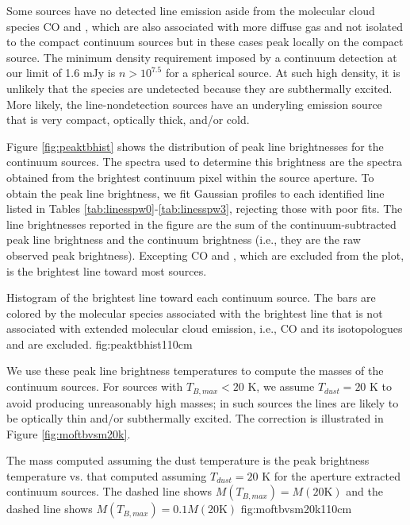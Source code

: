 \documentclass{aa}
\begin{document}
Some sources have no detected line emission aside from the molecular cloud
species CO and \formaldehyde, which are also associated with more diffuse gas
and not isolated to the compact continuum sources but in these cases peak
locally on the compact source.  The minimum density requirement imposed by a
continuum detection at our limit of 1.6 mJy is $n>10^{7.5}$ \percc for a
spherical source.  At such high density, it is unlikely that the species are
undetected because they are subthermally excited.  More likely, the
line-nondetection sources have an underyling emission source that is very
compact, optically thick, and/or cold.

Figure \ref{fig:peaktbhist} shows the distribution of peak line brightnesses
for the continuum sources.  The spectra used to determine this brightness are
the spectra obtained from the brightest continuum pixel within the source
aperture.  To obtain the peak line brightness, we fit Gaussian profiles to each
identified line listed in Tables \ref{tab:linesspw0}-\ref{tab:linesspw3},
rejecting those with poor fits.  The line brightnesses reported in the figure
are the sum of the continuum-subtracted peak line brightness and the continuum
brightness (i.e., they are the raw observed peak brightness).  Excepting CO and
\formaldehyde, which are excluded from the plot, \methanol is the brightest
line toward most sources. 

{Histogram of the brightest line toward each continuum source.
The bars are colored by the molecular species associated with the brightest
line that is not associated with extended molecular cloud emission,
i.e., CO and its isotopologues and \formaldehyde are excluded.}
{fig:peaktbhist}{1}{10cm}

We use these peak line brightness temperatures to compute the masses of the
continuum sources.  For sources with $T_{B,max} < 20$ K, we assume $T_{dust} =
20$ K to avoid producing unreasonably high masses; in such sources the lines
are likely to be optically thin and/or subthermally excited.  The correction is
illustrated in Figure \ref{fig:moftbvsm20k}.

{The mass computed assuming the dust temperature is the peak brightness
temperature vs. that computed assuming $T_{dust}=20$ K  for the aperture extracted
continuum sources.
The dashed line shows $M(T_{B,max}) =
M(20\textrm{K})$ and the dashed line shows $M(T_{B,max}) = 0.1 
M(20\textrm{K})$ 
}{fig:moftbvsm20k}{1}{10cm}
\end{document}
